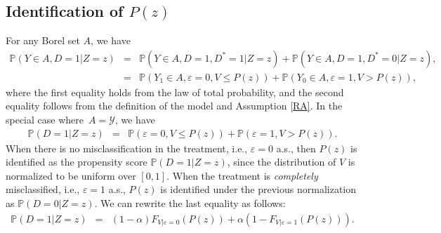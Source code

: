 \documentclass[11pt,reqno]{amsart}
\theoremstyle{plain}
\numberwithin{equation}{section}
\begin{document}
\subsection{Identification of $P(z)$}
For any Borel set $A$, we have 
\begin{eqnarray}
\mathbb P(Y\in A, D=1 \vert Z=z)&=&\mathbb P(Y\in A, D=1, D^*=1 \vert Z=z) + \mathbb P(Y\in A, D=1, D^*=0 \vert Z=z),\nonumber\\
&=& \mathbb P(Y_1\in A, \varepsilon=0, V \leq P(z)) + \mathbb P(Y_0\in A, \varepsilon=1, V > P(z)), \label{eq1}
\end{eqnarray}
where the first equality holds from the law of total probability, and the second equality follows from the definition of the model and Assumption \ref{RA}. In the special case where~$A=\mathcal Y$, we have
\begin{eqnarray}\label{eq:mis0}
\mathbb P(D=1 \vert Z=z)&=& \mathbb P(\varepsilon=0, V \leq P(z)) + \mathbb P(\varepsilon=1, V > P(z)).
\end{eqnarray}
When there is no misclassification in the treatment, i.e., $\varepsilon=0$ a.s., then $P(z)$ is identified as the propensity score $\mathbb P(D=1 \vert Z=z)$, since the distribution of $V$ is normalized to be uniform over $[0,1]$. When the treatment is \textit{completely} misclassified, i.e., $\varepsilon=1$ a.s., $P(z)$ is identified under the previous normalization as $\mathbb P(D=0 \vert Z=z)$. We can rewrite the last equality as follows: 
\begin{eqnarray}
\mathbb P(D=1 \vert Z=z)&=& (1-\alpha) F_{V\vert \varepsilon=0}(P(z)) + \alpha (1-F_{V\vert \varepsilon=1}(P(z))). \label{eq2}
\end{eqnarray}
\end{document}
